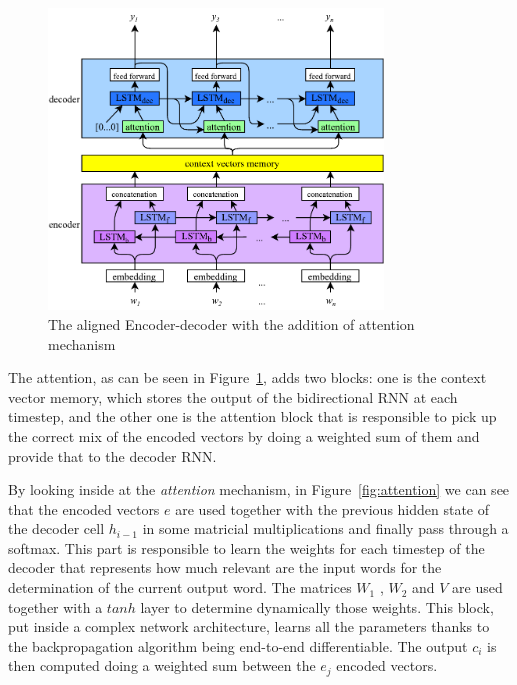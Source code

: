 
\begin{figure}[!htbp]
    \centering
    \includegraphics[max width=\linewidth,max height=8cm,keepaspectratio]{figures/encoderDecoderAttention}
    \caption{The aligned Encoder-decoder with the addition of attention mechanism}\label{fig:encoderDecoderAttention}
\end{figure}

The attention, as can be seen in Figure~\ref{fig:encoderDecoderAttention}, adds two blocks: one is the context vector memory, which stores the output of the bidirectional RNN at each timestep, and the other one is the attention block that is responsible to pick up the correct mix of the encoded vectors by doing a weighted sum of them and provide that to the decoder RNN. 

By looking inside at the \textit{attention} mechanism, in Figure~\ref{fig:attention} we can see that the encoded vectors  \( e \)  are used together with the previous hidden state of the decoder cell  \( h_{i-1} \) in some matricial multiplications and finally pass through a softmax. This part is responsible to learn the weights for each timestep of the decoder that represents how much relevant are the input words for the determination of the current output word. The matrices  \( W_{1} \) , \( W_{2} \)  and  \( V \) are used together with a  \( tanh \)  layer to determine dynamically those weights. This block, put inside a complex network architecture, learns all the parameters thanks to the backpropagation algorithm being end-to-end differentiable. The output  \( c_{i} \)  is then computed doing a weighted sum between the  \( e_{j} \)  encoded vectors.


